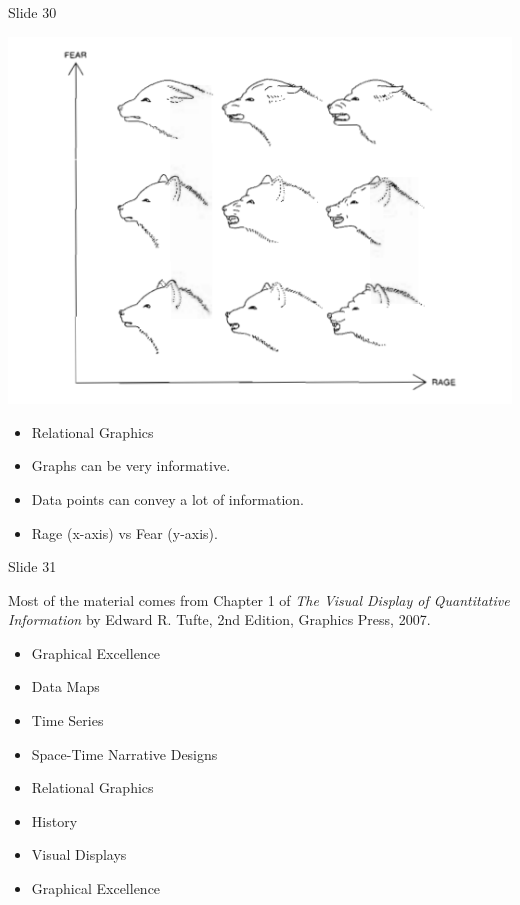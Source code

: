 \documentclass[
  ignorenonframetext,
]{beamer}
\begin{document}
\begin{frame}{Slide 30}
\protect\hypertarget{slide-30}{}
\begin{minipage}{0.45\textwidth}
\centering
\includegraphics[width=\textwidth]{excellence_figs/fig_27.png}
\end{minipage}
\hfill
\begin{minipage}{0.5\textwidth}
\footnotesize
\begin{itemize}
  \item Relational Graphics
  \item Graphs can be very informative.
  \item Data points can convey a lot of information.
  \item Rage (x-axis) vs Fear (y-axis).
\end{itemize}
\end{minipage}
\end{frame}

\begin{frame}{Slide 31}
\protect\hypertarget{slide-31}{}
\footnotesize

Most of the material comes from Chapter 1 of \emph{The Visual Display of
Quantitative Information} by Edward R. Tufte, 2nd Edition, Graphics
Press, 2007.

\begin{itemize}
  \item Graphical Excellence
  \item Data Maps
  \item Time Series
  \item Space-Time Narrative Designs
  \item Relational Graphics
  \item History
  \item Visual Displays
  \item Graphical Excellence
\end{itemize}
\end{frame}
\end{document}
